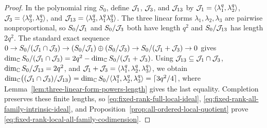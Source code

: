 \begin{proof}
	In the polynomial ring \(S_0\), define \(\mathcal J_1\), \(\mathcal J_3\), and \(\mathcal J_{13}\) by \(\mathcal J_1=\langle\lambda_1^q,\lambda_2^q\rangle\), \(\mathcal J_3=\langle\lambda_3^q,\lambda_2^q\rangle\), and \(\mathcal J_{13}=\langle\lambda_2^q,\lambda_1^q\lambda_3^q\rangle\).
	The three linear forms \(\lambda_1,\lambda_2,\lambda_3\) are pairwise nonproportional, so \(S_0/\mathcal J_1\) and \(S_0/\mathcal J_3\) both have length \(q^2\) and \(S_0/\mathcal J_{13}\) has length \(2q^2\).
	The standard exact sequence \(0\to S_0/(\mathcal J_1\cap\mathcal J_3)\to(S_0/\mathcal J_1)\oplus(S_0/\mathcal J_3)\to S_0/(\mathcal J_1+\mathcal J_3)\to0\) gives \(\dim_{\mathbb C}S_0/(\mathcal J_1\cap\mathcal J_3)=2q^2-\dim_{\mathbb C}S_0/(\mathcal J_1+\mathcal J_3)\).
	Using \(\mathcal J_{13}\subseteq\mathcal J_1\cap\mathcal J_3\), \(\dim_{\mathbb C}S_0/\mathcal J_{13}=2q^2\), and \(\mathcal J_1+\mathcal J_3=\langle\lambda_1^q,\lambda_2^q,\lambda_3^q\rangle\), we obtain \(\dim_{\mathbb C}\bigl((\mathcal J_1\cap\mathcal J_3)/\mathcal J_{13}\bigr)=\dim_{\mathbb C}S_0/\langle\lambda_1^q,\lambda_2^q,\lambda_3^q\rangle=\lceil3q^2/4\rceil\), where Lemma~\ref{lem:three-linear-form-powers-length} gives the last equality.
	Completion preserves these finite lengths, so \eqref{eq:fixed-rank-full-local-ideal}, \eqref{eq:fixed-rank-all-family-intrinsic-ideal}, and Proposition~\ref{prop:all-ordered-local-quotient} prove \eqref{eq:fixed-rank-local-all-family-codimension}.


\end{proof}
